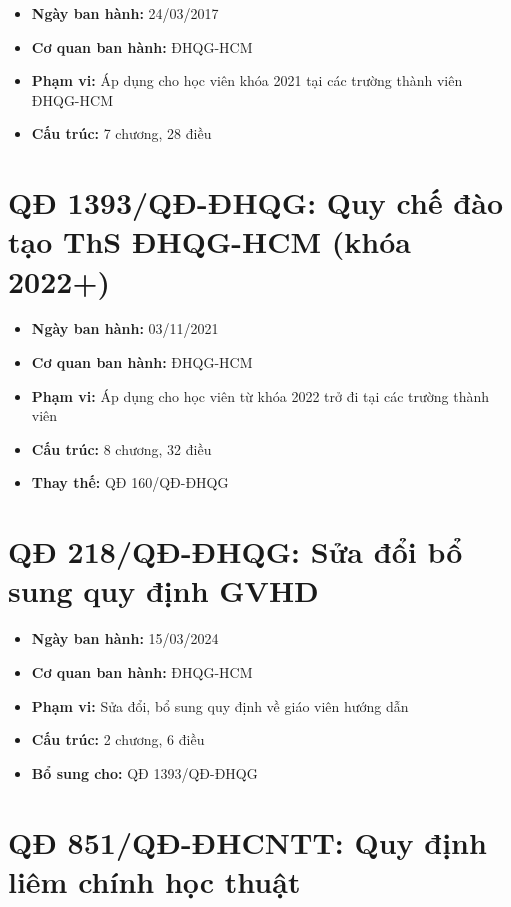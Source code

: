 \begin{itemize}
  \item \textbf{Ngày ban hành:} 24/03/2017
  \item \textbf{Cơ quan ban hành:} ĐHQG-HCM
  \item \textbf{Phạm vi:} Áp dụng cho học viên khóa 2021 tại các trường thành viên ĐHQG-HCM
  \item \textbf{Cấu trúc:} 7 chương, 28 điều
\end{itemize}

\section{QĐ 1393/QĐ-ĐHQG: Quy chế đào tạo ThS ĐHQG-HCM (khóa 2022+)}
\label{sec:app-qd1393}

\begin{itemize}
  \item \textbf{Ngày ban hành:} 03/11/2021
  \item \textbf{Cơ quan ban hành:} ĐHQG-HCM
  \item \textbf{Phạm vi:} Áp dụng cho học viên từ khóa 2022 trở đi tại các trường thành viên
  \item \textbf{Cấu trúc:} 8 chương, 32 điều
  \item \textbf{Thay thế:} QĐ 160/QĐ-ĐHQG
\end{itemize}

\section{QĐ 218/QĐ-ĐHQG: Sửa đổi bổ sung quy định GVHD}
\label{sec:app-qd218}

\begin{itemize}
  \item \textbf{Ngày ban hành:} 15/03/2024
  \item \textbf{Cơ quan ban hành:} ĐHQG-HCM
  \item \textbf{Phạm vi:} Sửa đổi, bổ sung quy định về giáo viên hướng dẫn
  \item \textbf{Cấu trúc:} 2 chương, 6 điều
  \item \textbf{Bổ sung cho:} QĐ 1393/QĐ-ĐHQG
\end{itemize}

\section{QĐ 851/QĐ-ĐHCNTT: Quy định liêm chính học thuật}
\label{sec:app-qd851}

